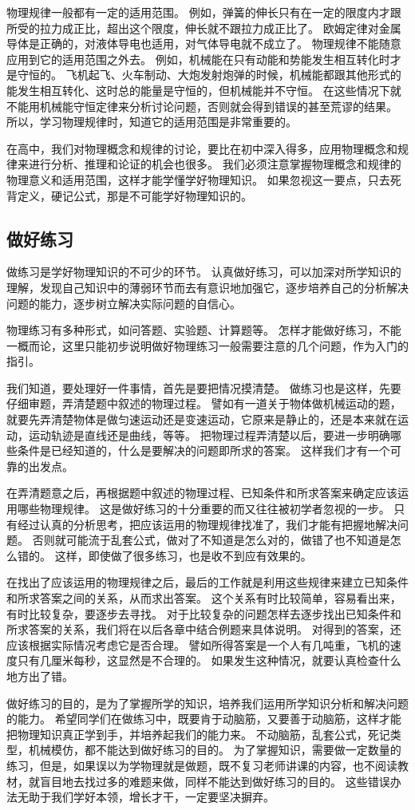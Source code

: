 物理规律一般都有一定的适用范围。
例如，弹簧的伸长只有在一定的限度内才跟所受的拉力成正比，超出这个限度，伸长就不跟拉力成正比了。
欧姆定律对金属导体是正确的，对液体导电也适用，对气体导电就不成立了。
物理规律不能随意应用到它的适用范围之外去。
例如，机械能在只有动能和势能发生相互转化时才是守恒的。
飞机起飞、火车制动、大炮发射炮弹的时候，机械能都跟其他形式的能发生相互转化、这时总的能量是守恒的，但机械能并不守恒。
在这些情况下就不能用机械能守恒定律来分析讨论问题，否则就会得到错误的甚至荒谬的结果。
所以，学习物理规律时，知道它的适用范围是非常重要的。

在高中，我们对物理概念和规律的讨论，要比在初中深入得多，应用物理概念和规律来进行分析、推理和论证的机会也很多。
我们必须注意掌握物理概念和规律的物理意义和适用范围，这样才能学懂学好物理知识。
如果忽视这一要点，只去死背定义，硬记公式，那是不可能学好物理知识的。


\subsection*{做好练习}
做练习是学好物理知识的不可少的环节。
认真做好练习，可以加深对所学知识的理解，发现自己知识中的薄弱环节而去有意识地加强它，逐步培养自己的分析解决问题的能力，逐步树立解决实际问题的自信心。

物理练习有多种形式，如问答题、实验题、计算题等。
怎样才能做好练习，不能一概而论，这里只能初步说明做好物理练习一般需要注意的几个问题，作为入门的指引。

我们知道，要处理好一件事情，首先是要把情况摸清楚。
做练习也是这样，先要仔细审题，弄清楚题中叙述的物理过程。
譬如有一道关于物体做机械运动的题，就要先弄清楚物体是做匀速运动还是变速运动，它原来是静止的，还是本来就在运动，运动轨迹是直线还是曲线，等等。
把物理过程弄清楚以后，要进一步明确哪些条件是已经知道的，什么是要解决的问题即所求的答案。
这样我们才有一个可靠的出发点。

在弄清题意之后，再根据题中叙述的物理过程、已知条件和所求答案来确定应该运用哪些物理规律。
这是做好练习的十分重要的而又往往被初学者忽视的一步。
只有经过认真的分析思考，把应该运用的物理规律找准了，我们才能有把握地解决问题。
否则就可能流于乱套公式，做对了不知道是怎么对的，做错了也不知道是怎么错的。
这样，即使做了很多练习，也是收不到应有效果的。

在找出了应该运用的物理规律之后，最后的工作就是利用这些规律来建立已知条件和所求答案之间的关系，从而求出答案。
这个关系有时比较简单，容易看出来，有时比较复杂，要逐步去寻找。
对于比较复杂的问题怎样去逐步找出已知条件和所求答案的关系，我们将在以后各章中结合例题来具体说明。
对得到的答案，还应该根据实际情况考虑它是否合理。
譬如所得答案是一个人有几吨重，飞机的速度只有几厘米每秒，这显然是不合理的。
如果发生这种情况，就要认真检查什么地方出了错。

做好练习的目的，是为了掌握所学的知识，培养我们运用所学知识分析和解决问题的能力。
希望同学们在做练习中，既要肯于动脑筋，又要善于动脑筋，这样才能把物理知识真正学到手，并培养起我们的能力来。
不动脑筋，乱套公式，死记类型，机械模仿，都不能达到做好练习的目的。
为了掌握知识，需要做一定数量的练习，但是，如果误以为学物理就是做题，既不复习老师讲课的内容，也不阅读教材，就盲目地去找过多的难题来做，同样不能达到做好练习的目的。
这些错误办法无助于我们学好本领，增长才干，一定要坚决摒弃。